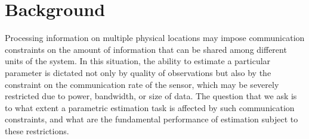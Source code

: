 \documentclass[letterpaper, conference]{IEEEtran}      %
\begin{document}
\section{Background}
\label{sec:Intro}
Processing information on multiple physical locations may impose communication constraints on the amount of information that can be shared among different units of the system. 
In this situation, the ability to estimate a particular parameter is dictated not only by quality of observations but also by the constraint on the communication rate of the sensor, which may be severely restricted due to power, bandwidth, or size of data. The question that we ask is to what extent a parametric estimation task is affected by such communication constraints, and what are the fundamental performance of estimation subject to these restrictions. \\
\end{document}
